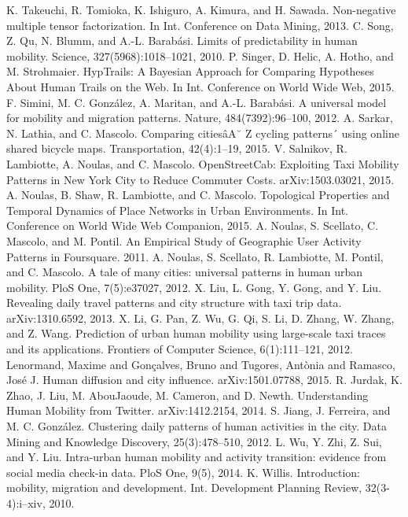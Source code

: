 \documentclass[a4paper, 10pt, conference]{ieeeconf}      %
\begin{document}
\begin{thebibliography}{99}
\bibitem{}K. Takeuchi, R. Tomioka, K. Ishiguro, A. Kimura, and H. Sawada. Non-negative multiple tensor factorization. In Int. Conference on Data Mining, 2013.
\bibitem{}C. Song, Z. Qu, N. Blumm, and A.-L. Barabási. Limits of predictability in human mobility. Science, 327(5968):1018–1021, 2010.
\bibitem{}P. Singer, D. Helic, A. Hotho, and M. Strohmaier. HypTrails: A Bayesian Approach for Comparing Hypotheses About Human Trails on the Web. In Int. Conference on World Wide Web, 2015.
\bibitem{}F. Simini, M. C. González, A. Maritan, and A.-L. Barabási. A universal model for mobility and migration patterns. Nature, 484(7392):96–100, 2012.
\bibitem{}A. Sarkar, N. Lathia, and C. Mascolo. Comparing citiesâA˘ Z cycling patterns´ using online shared bicycle maps. Transportation, 42(4):1–19, 2015.
\bibitem{}V. Salnikov, R. Lambiotte, A. Noulas, and C. Mascolo. OpenStreetCab: Exploiting Taxi Mobility Patterns in New York City to Reduce Commuter Costs. arXiv:1503.03021, 2015.
\bibitem{}A. Noulas, B. Shaw, R. Lambiotte, and C. Mascolo. Topological Properties and Temporal Dynamics of Place Networks in Urban Environments. In Int. Conference on World Wide Web Companion, 2015.
\bibitem{}A. Noulas, S. Scellato, C. Mascolo, and M. Pontil. An Empirical Study of Geographic User Activity Patterns in Foursquare. 2011.
\bibitem{}A. Noulas, S. Scellato, R. Lambiotte, M. Pontil, and C. Mascolo. A tale of many cities: universal patterns in human urban mobility. PloS One, 7(5):e37027, 2012.
\bibitem{}X. Liu, L. Gong, Y. Gong, and Y. Liu. Revealing daily travel patterns and city structure with taxi trip data. arXiv:1310.6592, 2013.
\bibitem{}X. Li, G. Pan, Z. Wu, G. Qi, S. Li, D. Zhang, W. Zhang, and Z. Wang. Prediction of urban human mobility using large-scale taxi traces and its applications. Frontiers of Computer Science, 6(1):111–121, 2012.
\bibitem{}Lenormand, Maxime and Gonçalves, Bruno and Tugores, Antònia and Ramasco, José J. Human diffusion and city influence. arXiv:1501.07788, 2015.
\bibitem{}R. Jurdak, K. Zhao, J. Liu, M. AbouJaoude, M. Cameron, and D. Newth. Understanding Human Mobility from Twitter. arXiv:1412.2154, 2014.
\bibitem{}S. Jiang, J. Ferreira, and M. C. González. Clustering daily patterns of human activities in the city. Data Mining and Knowledge Discovery, 25(3):478–510, 2012.
\bibitem{}L. Wu, Y. Zhi, Z. Sui, and Y. Liu. Intra-urban human mobility and activity transition: evidence from social media check-in data. PloS One, 9(5), 2014.
\bibitem{}K. Willis. Introduction: mobility, migration and development. Int. Development Planning Review, 32(3-4):i–xiv, 2010.

\end{thebibliography}
\end{document}
